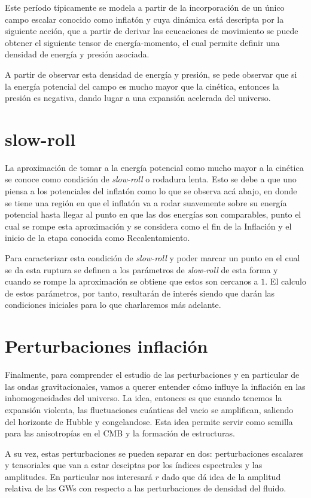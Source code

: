 \documentclass[letterpaper,12pt]{report}
\begin{document}
    Este período típicamente se modela a partir de la incorporación de un único campo escalar conocido como inflatón y cuya dinámica está descripta por la siguiente acción, que a partir de derivar las ecucaciones de movimiento se puede obtener el siguiente tensor de energía-momento, el cual permite definir una densidad de energía y presión asociada.

    A partir de observar esta densidad de energía y presión, se pede observar que si la energía potencial del campo es mucho mayor que la cinética, entonces la presión es negativa, dando lugar a una expansión acelerada del universo.
  
  \section{slow-roll}
    La aproximación de tomar a la energía potencial como mucho mayor a la cinética se conoce como condición de \textit{slow-roll} o rodadura lenta. Esto se debe a que uno piensa a los potenciales del inflatón como lo que se observa acá abajo, en donde se tiene una región en que el inflatón va a rodar suavemente sobre su energía potencial hasta llegar al punto en que las dos energías son comparables, punto el cual se rompe esta aproximación y se considera como el fin de la Inflación y el inicio de la etapa conocida como Recalentamiento.
    
    Para caracterizar esta condición de \textit{slow-roll} y poder marcar un punto en el cual se da esta ruptura se definen a los parámetros de \textit{slow-roll} de esta forma y cuando se rompe la aproximación se obtiene que estos son cercanos a $1$. El calculo de estos parámetros, por tanto, resultarán de interés siendo que darán las condiciones iniciales para lo que charlaremos más adelante.

  \section{Perturbaciones inflación}
    Finalmente, para comprender el estudio de las perturbaciones y en particular de las ondas gravitacionales, vamos a querer entender cómo influye la inflación en las inhomogeneidades del universo. La idea, entonces es que cuando tenemos la expansión violenta, las fluctuaciones cuánticas del vacio se amplifican, saliendo del horizonte de Hubble y congelandose. Esta idea permite servir como semilla para las anisotropías en el CMB y la formación de estructuras.

    A su vez, estas perturbaciones se pueden separar en dos: perturbaciones escalares y tensoriales que van a estar desciptas por los índices espectrales y las amplitudes. En particular nos interesará $r$ dado que dá idea de la amplitud relativa de las GWs con respecto a las perturbaciones de densidad del fluido.
\end{document}
